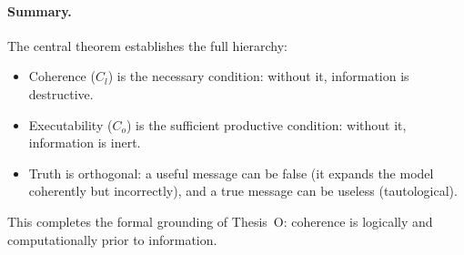 \documentclass{article}
\begin{document}
\paragraph{Summary.}
The central theorem establishes the full hierarchy:
\begin{itemize}
  \item Coherence ($C_l$) is the necessary condition: without it, information
        is destructive.
  \item Executability ($C_o$) is the sufficient productive condition: without
        it, information is inert.
  \item Truth is orthogonal: a useful message can be false (it expands the
        model coherently but incorrectly), and a true message can be useless
        (tautological).
\end{itemize}
This completes the formal grounding of Thesis~O: coherence is logically and
computationally prior to information.
\end{document}
